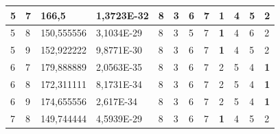 \documentclass[conference]{IEEEtran}
\begin{document}
\begin{table}[]
\begin{tabular}{|llll|llllllll|}
		\multicolumn{1}{|l|}{5}   & \multicolumn{1}{l|}{7}         & \multicolumn{1}{l|}{166,5}         & 1,3723E-32 & \multicolumn{1}{l|}{8}   & \multicolumn{1}{l|}{3}   & \multicolumn{1}{l|}{6}   & \multicolumn{1}{l|}{7}   & \multicolumn{1}{l|}{\textbf{1}} & \multicolumn{1}{l|}{4}   & \multicolumn{1}{l|}{5}   & 2                      \\ \hline
		\multicolumn{1}{|l|}{5}   & \multicolumn{1}{l|}{8}         & \multicolumn{1}{l|}{150,555556}    & 3,1034E-29 & \multicolumn{1}{l|}{8}   & \multicolumn{1}{l|}{3}   & \multicolumn{1}{l|}{5}   & \multicolumn{1}{l|}{7}   & \multicolumn{1}{l|}{\textbf{1}} & \multicolumn{1}{l|}{4}   & \multicolumn{1}{l|}{6}   & 2                      \\ \hline
		\multicolumn{1}{|l|}{5}   & \multicolumn{1}{l|}{9}         & \multicolumn{1}{l|}{152,922222}    & 9,8771E-30 & \multicolumn{1}{l|}{8}   & \multicolumn{1}{l|}{3}   & \multicolumn{1}{l|}{6}   & \multicolumn{1}{l|}{7}   & \multicolumn{1}{l|}{\textbf{1}} & \multicolumn{1}{l|}{4}   & \multicolumn{1}{l|}{5}   & 2                      \\ \hline
		\multicolumn{1}{|l|}{6}   & \multicolumn{1}{l|}{7}         & \multicolumn{1}{l|}{179,888889}    & 2,0563E-35 & \multicolumn{1}{l|}{8}   & \multicolumn{1}{l|}{3}   & \multicolumn{1}{l|}{6}   & \multicolumn{1}{l|}{7}   & \multicolumn{1}{l|}{2}          & \multicolumn{1}{l|}{5}   & \multicolumn{1}{l|}{4}   & \textbf{1}             \\ \hline
		\multicolumn{1}{|l|}{6}   & \multicolumn{1}{l|}{8}         & \multicolumn{1}{l|}{172,311111}    & 8,1731E-34 & \multicolumn{1}{l|}{8}   & \multicolumn{1}{l|}{3}   & \multicolumn{1}{l|}{6}   & \multicolumn{1}{l|}{7}   & \multicolumn{1}{l|}{2}          & \multicolumn{1}{l|}{5}   & \multicolumn{1}{l|}{4}   & \textbf{1}             \\ \hline
		\multicolumn{1}{|l|}{6}   & \multicolumn{1}{l|}{9}         & \multicolumn{1}{l|}{174,655556}    & 2,617E-34  & \multicolumn{1}{l|}{8}   & \multicolumn{1}{l|}{3}   & \multicolumn{1}{l|}{6}   & \multicolumn{1}{l|}{7}   & \multicolumn{1}{l|}{2}          & \multicolumn{1}{l|}{5}   & \multicolumn{1}{l|}{4}   & \textbf{1}             \\ \hline
		\multicolumn{1}{|l|}{7}   & \multicolumn{1}{l|}{8}         & \multicolumn{1}{l|}{149,744444}    & 4,5939E-29 & \multicolumn{1}{l|}{8}   & \multicolumn{1}{l|}{3}   & \multicolumn{1}{l|}{6}   & \multicolumn{1}{l|}{7}   & \multicolumn{1}{l|}{\textbf{1}} & \multicolumn{1}{l|}{4}   & \multicolumn{1}{l|}{5}   & 2                      \\ \hline

\end{tabular}
\end{table}
\end{document}
